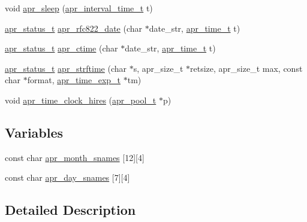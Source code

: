 \begin{DoxyCompactItemize}
\item 
void \hyperlink{group__apr__time_ga8ffddc239a3d8051d9972cee080fd761}{apr\-\_\-sleep} (\hyperlink{group__apr__time_gaae2129185a395cc393f76fabf4f43e47}{apr\-\_\-interval\-\_\-time\-\_\-t} t)
\item 
\hyperlink{group__apr__errno_gaf76ee4543247e9fb3f3546203e590a6c}{apr\-\_\-status\-\_\-t} \hyperlink{group__apr__time_gad77b323dd4402ac89c51240f19015df5}{apr\-\_\-rfc822\-\_\-date} (char $\ast$date\-\_\-str, \hyperlink{group__apr__time_gadb4bde16055748190eae190c55aa02bb}{apr\-\_\-time\-\_\-t} t)
\item 
\hyperlink{group__apr__errno_gaf76ee4543247e9fb3f3546203e590a6c}{apr\-\_\-status\-\_\-t} \hyperlink{group__apr__time_gad1fcb8f26d508fbb34ea2beca7bc851e}{apr\-\_\-ctime} (char $\ast$date\-\_\-str, \hyperlink{group__apr__time_gadb4bde16055748190eae190c55aa02bb}{apr\-\_\-time\-\_\-t} t)
\item 
\hyperlink{group__apr__errno_gaf76ee4543247e9fb3f3546203e590a6c}{apr\-\_\-status\-\_\-t} \hyperlink{group__apr__time_ga3f5e1aa45e735f3bcf8c13fb718c214f}{apr\-\_\-strftime} (char $\ast$s, apr\-\_\-size\-\_\-t $\ast$retsize, apr\-\_\-size\-\_\-t max, const char $\ast$format, \hyperlink{structapr__time__exp__t}{apr\-\_\-time\-\_\-exp\-\_\-t} $\ast$tm)
\item 
void \hyperlink{group__apr__time_gac47e0b54f17857f0ce2925b2930b5500}{apr\-\_\-time\-\_\-clock\-\_\-hires} (\hyperlink{group__apr__pools_gaf137f28edcf9a086cd6bc36c20d7cdfb}{apr\-\_\-pool\-\_\-t} $\ast$p)
\end{DoxyCompactItemize}
\subsection*{Variables}
\begin{DoxyCompactItemize}
\item 
const char \hyperlink{group__apr__time_ga77382d017a2bef80d44478e0b41557a4}{apr\-\_\-month\-\_\-snames} \mbox{[}12\mbox{]}\mbox{[}4\mbox{]}
\item 
const char \hyperlink{group__apr__time_ga37d6f7740ae0f5d8ae9cfc286e8712be}{apr\-\_\-day\-\_\-snames} \mbox{[}7\mbox{]}\mbox{[}4\mbox{]}
\end{DoxyCompactItemize}


\subsection{Detailed Description}


